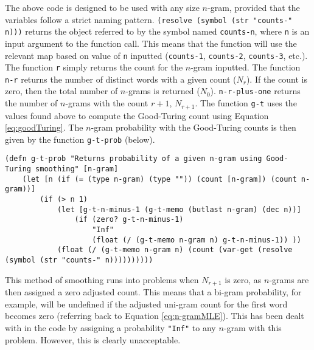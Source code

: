 

The above code is designed to be used with any size $n$-gram, provided that the variables follow a strict naming pattern. \lstinline!(resolve (symbol (str "counts-" n)))! returns the object referred to by the symbol named \lstinline!counts-n!, where \lstinline!n! is an input argument to the function call. This means that the function will use the relevant map based on value of \lstinline!n! inputted (\lstinline!counts-1!, \lstinline!counts-2!, \lstinline!counts-3!, etc.). The function \lstinline!r! simply returns the count for the $n$-gram inputted. The function \lstinline!n-r! returns the number of distinct words with a given count ($N_{r}$). If the count is zero, then the total number of $n$-grams is returned ($N_{0}$). \lstinline!n-r-plus-one! returns the number of $n$-grams with the count $r+1$, $N_{r+1}$. The function \lstinline!g-t! uses the values found above to compute the Good-Turing count using Equation \ref{eq:goodTuring}. The $n$-gram probability with the Good-Turing counts is then given by the function \lstinline!g-t-prob! (below).

\begin{lstlisting}
(defn g-t-prob "Returns probability of a given n-gram using Good-Turing smoothing" [n-gram] 
	(let [n (if (= (type n-gram) (type "")) (count [n-gram]) (count n-gram))] 
		(if (> n 1)
			(let [g-t-n-minus-1 (g-t-memo (butlast n-gram) (dec n))]
				(if (zero? g-t-n-minus-1)
					"Inf"
					(float (/ (g-t-memo n-gram n) g-t-n-minus-1)) ))
			(float (/ (g-t-memo n-gram n) (count (var-get (resolve (symbol (str "counts-" n))))))))))
\end{lstlisting}

This method of smoothing runs into problems when $N_{r+1}$ is zero, as $n$-grams are then assigned a zero adjusted count. This means that a bi-gram probability, for example, will be undefined if the adjusted uni-gram count for the first word becomes zero (referring back to Equation \ref{eq:n-gramMLE}). This has been dealt with in the code by assigning a probability \lstinline!"Inf"! to any $n$-gram with this problem. However, this is clearly unacceptable.


